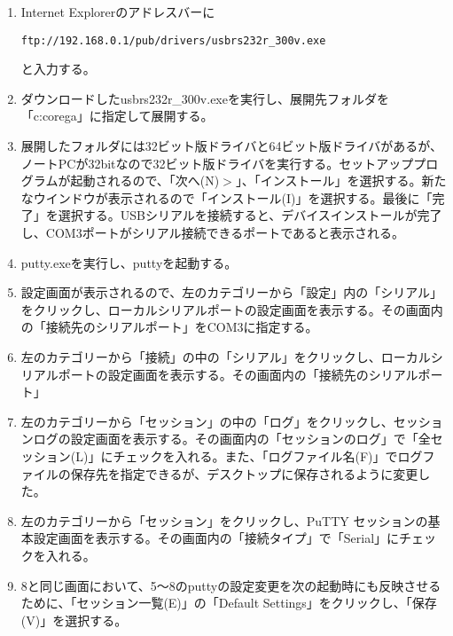 \documentclass[a4j,titlepage]{jarticle}
\begin{document}
\begin{enumerate}

\item Internet Explorerのアドレスバーに
\begin{screen}
\begin{center}
\begin{verbatim}
ftp://192.168.0.1/pub/drivers/usbrs232r_300v.exe
\end{verbatim}
\end{center}
\end{screen}
と入力する。

\item ダウンロードしたusbrs232r\_300v.exeを実行し、展開先フォルダを「c:\yen corega」に指定して展開する。

\item 展開したフォルダには32ビット版ドライバと64ビット版ドライバがあるが、ノートPCが32bitなので32ビット版ドライバを実行する。セットアッププログラムが起動されるので、「次へ(N)$>$」、「インストール」を選択する。新たなウインドウが表示されるので「インストール(I)」を選択する。最後に「完了」を選択する。USBシリアルを接続すると、デバイスインストールが完了し、COM3ポートがシリアル接続できるポートであると表示される。

\item putty.exeを実行し、puttyを起動する。

\item 設定画面が表示されるので、左のカテゴリーから「設定」内の「シリアル」をクリックし、ローカルシリアルポートの設定画面を表示する。その画面内の「接続先のシリアルポート」をCOM3に指定する。

\item 左のカテゴリーから「接続」の中の「シリアル」をクリックし、ローカルシリアルポートの設定画面を表示する。その画面内の「接続先のシリアルポート」

\item 左のカテゴリーから「セッション」の中の「ログ」をクリックし、セッションログの設定画面を表示する。その画面内の「セッションのログ」で「全セッション(L)」にチェックを入れる。また、「ログファイル名(F)」でログファイルの保存先を指定できるが、デスクトップに保存されるように変更した。

\item 左のカテゴリーから「セッション」をクリックし、PuTTY セッションの基本設定画面を表示する。その画面内の「接続タイプ」で「Serial」にチェックを入れる。

\item 8と同じ画面において、5～8のputtyの設定変更を次の起動時にも反映させるために、「セッション一覧(E)」の「Default Settings」をクリックし、「保存(V)」を選択する。

\end{enumerate}
\end{document}
